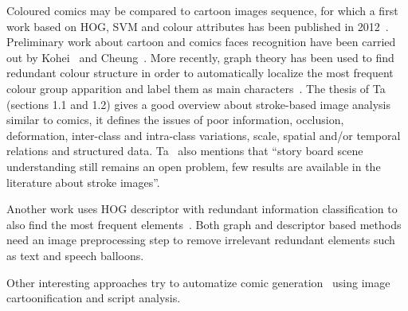 Coloured comics may be compared to cartoon images sequence, for which a first work based on HOG, SVM and colour attributes has been published in 2012~\cite{Khan12}.
Preliminary work about cartoon and comics faces recognition have been carried out by Kohei~\cite{Kohei2012} and Cheung~\cite{cheung2008face}.
More recently, graph theory has been used to find redundant colour structure in order to automatically localize the most frequent colour group apparition and label them as main characters~\cite{HoGREC2013}.
The thesis of Ta~\cite{TAPhD2010} (sections 1.1 and 1.2) gives a good overview about stroke-based image analysis similar to comics, it defines the issues of poor information, occlusion, deformation, inter-class and intra-class variations, scale, spatial and/or temporal relations and structured data.
Ta~\cite{TAPhD2010} also mentions that ``story board scene understanding still remains an open problem, few results are available in the literature about stroke images''.

Another work uses HOG descriptor with redundant information classification to also find the most frequent elements~\cite{SunICDAR2013}.
Both graph and descriptor based methods need an image preprocessing step to remove irrelevant redundant elements such as text and speech balloons.

Other interesting approaches try to automatize comic generation~\cite{Tobita2010Comic,WangHYYC12} using image cartoonification and script analysis.





